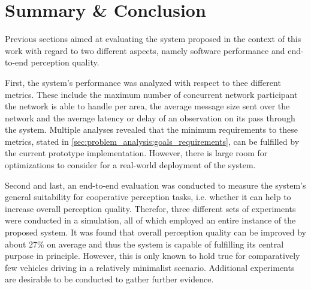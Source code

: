 \section{Summary \& Conclusion}
\label{sec:evaluation:summary_conclusion}
Previous sections aimed at evaluating the system proposed in the context of this work with regard to two different aspects, namely software performance and end-to-end perception quality. 

First, the system's performance was analyzed with respect to thee different metrics. These include the maximum number of concurrent network participant the network is able to handle per area, the average message size sent over the network and the average latency or delay of an observation on its pass through the system. Multiple analyses revealed that the minimum requirements to these metrics, stated in \cref{sec:problem_analysis:goals_requirements}, can be fulfilled by the current prototype implementation. However, there is large room for optimizations to consider for a real-world deployment of the system.

Second and last, an end-to-end evaluation was conducted to measure the system's general suitability for cooperative perception tasks, i.e. whether it can help to increase overall perception quality. Therefor, three different sets of experiments were conducted in a simulation, all of which employed an entire instance of the proposed system. It was found that overall perception quality can be improved by about 27\% on  average and thus the system is capable of fulfilling its central purpose in principle. However, this is only known to hold true for comparatively few vehicles driving in a relatively minimalist scenario. Additional experiments are desirable to be conducted to gather further evidence. 